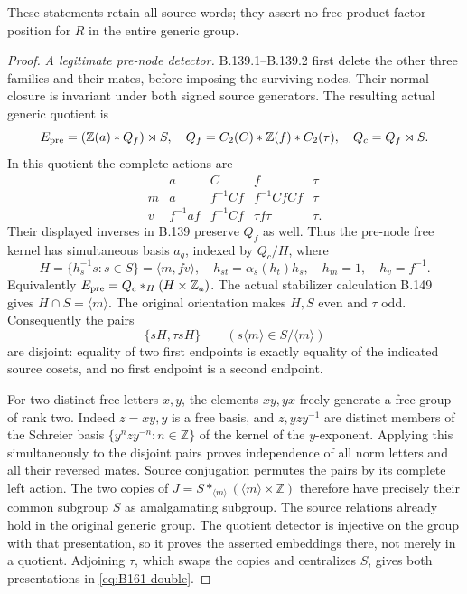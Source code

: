 These statements retain all source words; they assert no free-product
factor position for $R$ in the entire generic group.
\begin{proof}
\emph{A legitimate pre-node detector.}
B.139.1--B.139.2 first delete the other three families and their mates,
before imposing the surviving nodes. Their normal closure is invariant
under both signed source generators. The resulting actual generic quotient is
\[
 E_{\rm pre}=(\mathbb Z(a)*Q_f)\rtimes S,
 \quad Q_f=C_2(C)*\mathbb Z(f)*C_2(\tau),\quad Q_c=Q_f\rtimes S.
\]
In this quotient the complete actions are
\[
\begin{array}{c|cccc}
 &a&C&f&\tau\\\hline
 m&a&f^{-1}Cf&f^{-1}CfCf&\tau\\
 v&f^{-1}af&f^{-1}Cf&\tau f\tau&\tau.
\end{array}
\]
Their displayed inverses in B.139 preserve $Q_f$ as well. Thus the
pre-node free kernel has simultaneous basis $a_q$, indexed by $Q_c/H$,
where
\[
 H=\{h_s^{-1}s:s\in S\}=\langle m,fv\rangle,
 \quad h_{st}=\alpha_s(h_t)h_s,
 \quad h_m=1,\quad h_v=f^{-1}.
\]
Equivalently $E_{\rm pre}=Q_c*_{H}(H\times\mathbb Z_a)$.
The actual stabilizer calculation B.149 gives $H\cap S=\langle m\rangle$.
The original orientation makes $H,S$ even and $\tau$ odd. Consequently
the pairs
\[
 \{sH,\tau sH\}\qquad(s\langle m\rangle\in S/\langle m\rangle)
\]
are disjoint: equality of two first endpoints is exactly equality of
the indicated source cosets, and no first endpoint is a second endpoint.

For two distinct free letters $x,y$, the elements $xy,yx$ freely
generate a free group of rank two. Indeed $z=xy,y$ is a free basis,
and $z,yzy^{-1}$ are distinct members of the Schreier basis
$\{y^nzy^{-n}:n\in\mathbb Z\}$ of the kernel of the $y$-exponent.
Applying this simultaneously to the disjoint pairs proves independence
of all norm letters and all their reversed mates. Source conjugation
permutes the pairs by its complete left action. The two copies of
$J=S*_{\langle m\rangle}(\langle m\rangle\times\mathbb Z)$ therefore
have precisely their common subgroup $S$ as amalgamating subgroup.
The source relations already hold in the original generic group.
The quotient detector is injective on the group with that presentation,
so it proves the asserted embeddings there, not merely in a quotient.
Adjoining $\tau$, which swaps the copies and centralizes $S$, gives
both presentations in \eqref{eq:B161-double}.


\end{proof}
